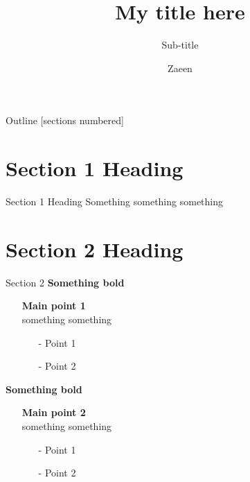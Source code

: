 \documentclass[aspectratio=169, 11pt]{beamer}
\title{\alert{\textbf{My title here}}}
\subtitle{Sub-title}
\date{}
\author{Zaeen}
\institute{Azim Premji University}
\begin{document}
	\maketitle

	\begin{frame}{Outline}
		\small
		[sections numbered]
		\tableofcontents[hideallsubsections]
	\end{frame}

	\section[Section 1]{Section 1 Heading}



	\begin{frame}[Section 1]{Section 1 Heading}
		Something something something
	\end{frame}

	\section[Section 2]{Section 2 Heading}

	\begin{frame}[Section 2]{Section 2}
		\small
		\alert{\textbf{Something bold}}
		\begin{itemize}
			\item[] \textbf{Main point 1} \\
			something something
			\begin{itemize}
				\item[-] Point 1
				\item[-] Point 2
			\end{itemize}
		\end{itemize}
		\alert{\textbf{Something bold}}
		\begin{itemize}
			\item[] \textbf{Main point 2} \\
			something something
			\begin{itemize}
				\item[-] Point 1
				\item[-] Point 2
			\end{itemize}
		\end{itemize}
	\end{frame}
\end{document}
